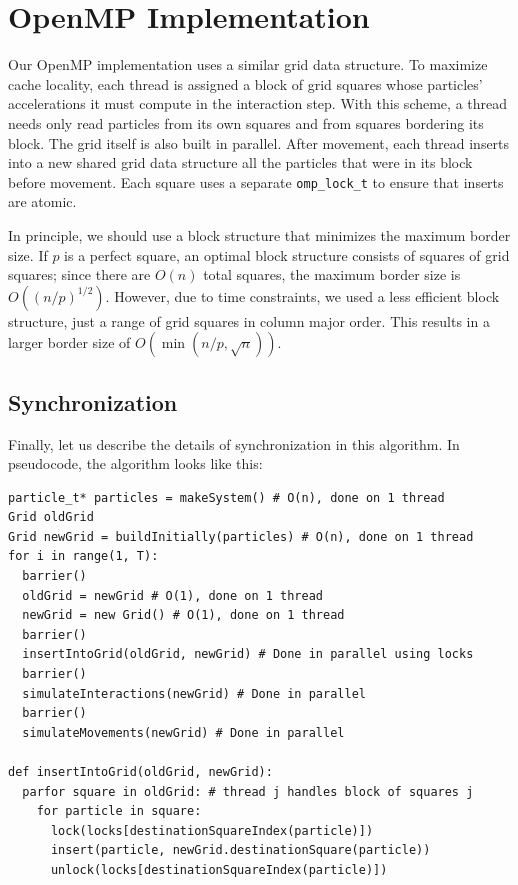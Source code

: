 \documentclass{article}
\newcommand{\code}[1]%
  {\texttt{#1}}
\begin{document}
\section{OpenMP Implementation}
Our OpenMP implementation uses a similar grid data structure.  To maximize cache locality, each thread is assigned a block of grid squares whose particles' accelerations it must compute in the interaction step.  With this scheme, a thread needs only read particles from its own squares and from squares bordering its block.  The grid itself is also built in parallel.  After movement, each thread inserts into a new shared grid data structure all the particles that were in its block before movement.  Each square uses a separate \code{omp\_lock\_t} to ensure that inserts are atomic.

In principle, we should use a block structure that minimizes the maximum border size.  If $p$ is a perfect square, an optimal block structure consists of squares of grid squares; since there are $O(n)$ total squares, the maximum border size is $O((n/p)^{1/2})$.  However, due to time constraints, we used a less efficient block structure, just a range of grid squares in column major order.  This results in a larger border size of $O(\min(n/p, \sqrt{n}))$.

\subsection{Synchronization}
Finally, let us describe the details of synchronization in this algorithm.  In pseudocode, the algorithm looks like this:

\begin{verbatim}
particle_t* particles = makeSystem() # O(n), done on 1 thread
Grid oldGrid
Grid newGrid = buildInitially(particles) # O(n), done on 1 thread
for i in range(1, T):
  barrier()
  oldGrid = newGrid # O(1), done on 1 thread
  newGrid = new Grid() # O(1), done on 1 thread
  barrier()
  insertIntoGrid(oldGrid, newGrid) # Done in parallel using locks
  barrier()
  simulateInteractions(newGrid) # Done in parallel
  barrier()
  simulateMovements(newGrid) # Done in parallel

def insertIntoGrid(oldGrid, newGrid):
  parfor square in oldGrid: # thread j handles block of squares j
    for particle in square:
      lock(locks[destinationSquareIndex(particle)])
      insert(particle, newGrid.destinationSquare(particle))
      unlock(locks[destinationSquareIndex(particle)])
\end{verbatim}
\end{document}
